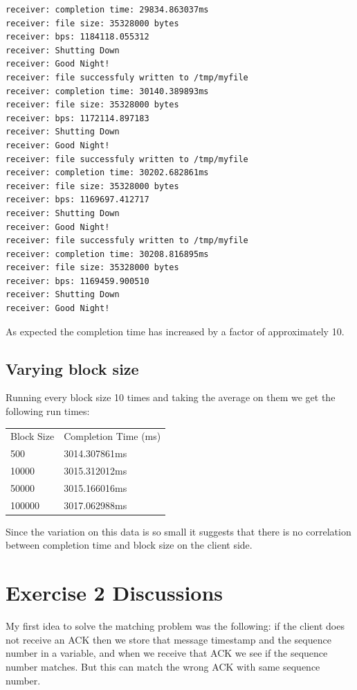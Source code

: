 \documentclass[paper=a4, fontsize=11pt]{scrartcl}
\numberwithin{equation}{section}		%
\numberwithin{figure}{section}			%
\numberwithin{table}{section}				%
\begin{document}
\begin{verbatim}
receiver: completion time: 29834.863037ms
receiver: file size: 35328000 bytes
receiver: bps: 1184118.055312
receiver: Shutting Down
receiver: Good Night!
receiver: file successfuly written to /tmp/myfile
receiver: completion time: 30140.389893ms
receiver: file size: 35328000 bytes
receiver: bps: 1172114.897183
receiver: Shutting Down
receiver: Good Night!
receiver: file successfuly written to /tmp/myfile
receiver: completion time: 30202.682861ms
receiver: file size: 35328000 bytes
receiver: bps: 1169697.412717
receiver: Shutting Down
receiver: Good Night!
receiver: file successfuly written to /tmp/myfile
receiver: completion time: 30208.816895ms
receiver: file size: 35328000 bytes
receiver: bps: 1169459.900510
receiver: Shutting Down
receiver: Good Night!
\end{verbatim}

As expected the completion time has increased by a factor of approximately 10.

\subsection{Varying block size}
Running every block size 10 times and taking the average on them
we get the following run times:

\begin{table}[h]
\begin{tabular}{|l|l|}
  \hline
 Block Size &  Completion Time (ms) \\
 500        &  3014.307861ms \\
 10000      &  3015.312012ms \\
 50000      &  3015.166016ms\\
 100000     &  3017.062988ms\\
 \hline
\end{tabular}
\end{table}

Since the variation on this data is so small it suggests that there is
no correlation between completion time and block size on the client side.


\section{Exercise 2 Discussions}
My first idea to solve the matching problem was the following:
if the client does not receive an ACK then we store that message
timestamp and the sequence number in a variable, and when we receive
that ACK we see if the sequence number matches. But this can
match the wrong ACK with same sequence number.
\end{document}
